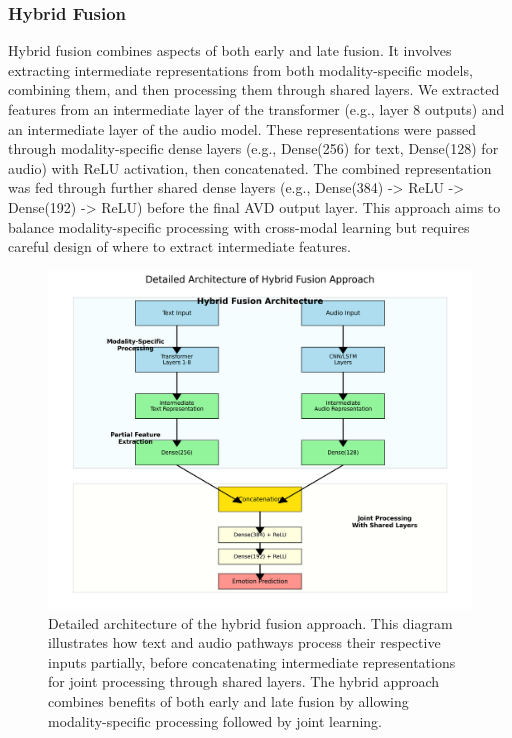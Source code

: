 \documentclass[12pt]{article}
\begin{document}
\subsubsection{Hybrid Fusion}
Hybrid fusion combines aspects of both early and late fusion. It involves extracting intermediate representations from both modality-specific models, combining them, and then processing them through shared layers. We extracted features from an intermediate layer of the transformer (e.g., layer 8 outputs) and an intermediate layer of the audio model. These representations were passed through modality-specific dense layers (e.g., Dense(256) for text, Dense(128) for audio) with ReLU activation, then concatenated. The combined representation was fed through further shared dense layers (e.g., Dense(384) -> ReLU -> Dense(192) -> ReLU) before the final AVD output layer. This approach aims to balance modality-specific processing with cross-modal learning but requires careful design of where to extract intermediate features.

\begin{figure}[h]
    \centering
    \includegraphics[width=0.9\linewidth]{Figures_Improved/hybrid_fusion_detailed_improved.png}
    \caption{Detailed architecture of the hybrid fusion approach. This diagram illustrates how text and audio pathways process their respective inputs partially, before concatenating intermediate representations for joint processing through shared layers. The hybrid approach combines benefits of both early and late fusion by allowing modality-specific processing followed by joint learning.}
    \label{fig:hybrid_fusion}
\end{figure}
\end{document}

